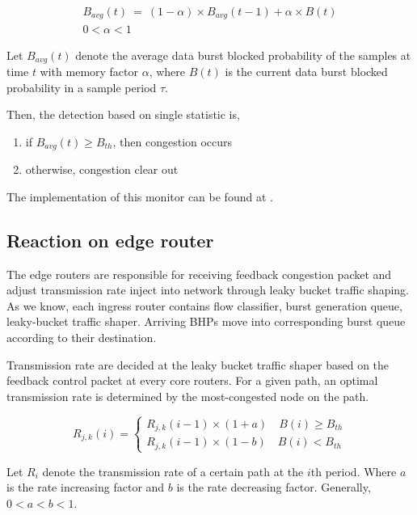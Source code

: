 \begin{eqnarray*}
    B_{avg}(t) ~=~ (1-\alpha) \times B_{avg}(t-1) + \alpha \times B(t) \\
    0<\alpha<1
\end{eqnarray*}

Let $B_{avg}(t)$ denote the average data burst blocked probability of the samples at time $t$ with memory factor $\alpha$, where $B(t)$ is the current data burst blocked probability in a sample period $\tau$.

Then, the detection based on single statistic is,

\begin{enumerate}
\item if $B_{avg}(t) \geq B_{th}$, then congestion occurs 
\item otherwise, congestion clear out
\end{enumerate}

The implementation of this monitor can be found at \cite{ref:monitor}.

\subsection{Reaction on edge router}

The edge routers are responsible for receiving feedback congestion packet and adjust transmission rate inject into network through leaky bucket traffic shaping. As we know, each ingress router contains flow classifier, burst generation queue, leaky-bucket traffic shaper. Arriving BHPs move into corresponding burst queue according to their destination. 

Transmission rate are decided at the leaky bucket traffic shaper based on the feedback control packet at every core routers. For a given path, an optimal transmission rate is determined by the most-congested node on the path. 

$$
     R_{j,k}(i)=\left\{
                    \begin{aligned}
                     R_{j,k}(i-1) \times (1 + a) \quad B(i) \geq B_{th}\\
                     R_{j,k}(i-1) \times (1 - b) \quad B(i) < B_{th}
                    \end{aligned}
\right.
$$

Let $R_{i}$ denote the transmission rate of a certain path at the $i$th period. Where $a$ is the rate increasing factor and $b$ is the rate decreasing factor. Generally, $0<a<b<1$.  


